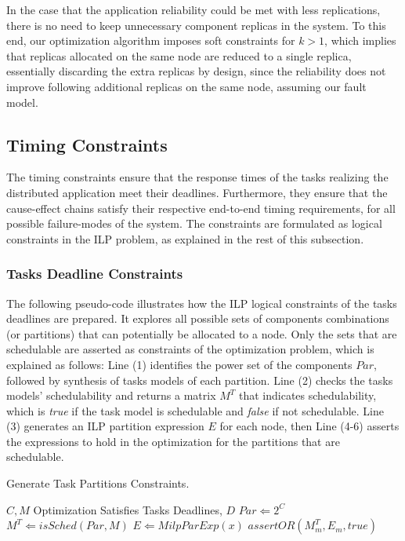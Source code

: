 In the case that the application reliability could be met with less replications, there is no need to keep unnecessary component replicas in the system. To this end, our optimization algorithm imposes soft constraints for $k>1$, which implies that replicas allocated on the same node are reduced to a single replica, essentially discarding the extra replicas by design, since the reliability does not improve following additional replicas on the same node, assuming our fault model.

\subsection{Timing Constraints}
The timing constraints ensure that the response times of the tasks realizing the distributed application meet their deadlines. Furthermore, they ensure that the cause-effect chains satisfy their respective end-to-end timing requirements, for all possible failure-modes of the system. The constraints are formulated as logical constraints in the ILP problem, as explained in the rest of this subsection.

\subsubsection*{Tasks Deadline Constraints}
The following pseudo-code illustrates how the ILP logical constraints of the tasks deadlines are prepared. It explores all possible sets of components combinations (or partitions) that can potentially be allocated to a node. Only the sets that are schedulable are asserted as constraints of the optimization problem, which is explained as follows: Line (1) identifies the power set of the components $Par$, followed by synthesis of tasks models of each partition. Line (2) checks the tasks models' schedulability and returns a matrix $M^T$ that indicates schedulability, which is \textit{true} if the task model is schedulable and \textit{false} if not schedulable. Line (3) generates an ILP partition expression $E$ for each node, then Line (4-6) asserts the expressions to hold in the optimization for the partitions that are schedulable.
\begin{algorithm}
\caption{Generate Task Partitions Constraints.}\label{alg_partition}
\renewcommand{\algorithmicrequire}{\textbf{Input:}}
\begin{algorithmic}[1]
\Require $C,M$
\Ensure Optimization Satisfies Tasks Deadlines, $D$
\State $Par \Leftarrow 2^C$	
\State $M^T\Leftarrow isSched(Par, M)$
\State $E\Leftarrow MilpParExp(x)$
	\State $assertOR(M^T_m, E_m, true)$
\EndFor
\end{algorithmic}
\end{algorithm}

